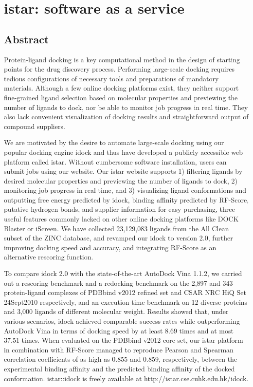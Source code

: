 \chapter{istar: software as a service}

\section{Abstract}

Protein-ligand docking is a key computational method in the design of starting points for the drug discovery process. Performing large-scale docking requires tedious configurations of necessary tools and preparations of mandatory materials. Although a few online docking platforms exist, they neither support fine-grained ligand selection based on molecular properties and previewing the number of ligands to dock, nor be able to monitor job progress in real time. They also lack convenient visualization of docking results and straightforward output of compound suppliers.

We are motivated by the desire to automate large-scale docking using our popular docking engine idock and thus have developed a publicly accessible web platform called istar. Without cumbersome software installation, users can submit jobs using our website. Our istar website supports 1) filtering ligands by desired molecular properties and previewing the number of ligands to dock, 2) monitoring job progress in real time, and 3) visualizing ligand conformations and outputting free energy predicted by idock, binding affinity predicted by RF-Score, putative hydrogen bonds, and supplier information for easy purchasing, three useful features commonly lacked on other online docking platforms like DOCK Blaster or iScreen. We have collected 23,129,083 ligands from the All Clean subset of the ZINC database, and revamped our idock to version 2.0, further improving docking speed and accuracy, and integrating RF-Score as an alternative rescoring function.

To compare idock 2.0 with the state-of-the-art AutoDock Vina 1.1.2, we carried out a rescoring benchmark and a redocking benchmark on the 2,897 and 343 protein-ligand complexes of PDBbind v2012 refined set and CSAR NRC HiQ Set 24Sept2010 respectively, and an execution time benchmark on 12 diverse proteins and 3,000 ligands of different molecular weight. Results showed that, under various scenarios, idock achieved comparable success rates while outperforming AutoDock Vina in terms of docking speed by at least 8.69 times and at most 37.51 times. When evaluated on the PDBbind v2012 core set, our istar platform in combination with RF-Score managed to reproduce Pearson and Spearman correlation coefficients of as high as 0.855 and 0.859, respectively, between the experimental binding affinity and the predicted binding affinity of the docked conformation. istar::idock is freely available at http://istar.cse.cuhk.edu.hk/idock.

